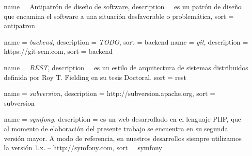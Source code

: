  {
  name = {Antipatrón de diseño de software},
  description = {es un patrón de diseño que encamina el software a una situación desfavorable o problemática},
  sort = {antipatron}
}

 {
  name = {\textit{backend}},
  description = {\textit{TODO}},
  sort = {backend}
}
 {
  name = {\textit{git}},
  description = {https://git-scm.com},
  sort = {backend}
}

 {
  name = {\textit{REST}},
  description = {es un estilo de arquitectura de sistemas distribuidos definida por Roy T. Fielding en su tesis Doctoral},
  sort = {rest}
}

 {
  name = {\textit{subversion}},
  description = {http://subversion.apache.org},
  sort = {subversion}
}

 {
  name = {\textit{symfony}},
  description = {es un  web desarrollado en el lenguaje PHP, que al momento de elaboración del presente trabajo se encuentra en su segunda versión mayor. A modo de referencia, en nuestros desarrollos siempre utilizamos la versión 1.x. – http://symfony.com},
  sort = {symfony}
}

